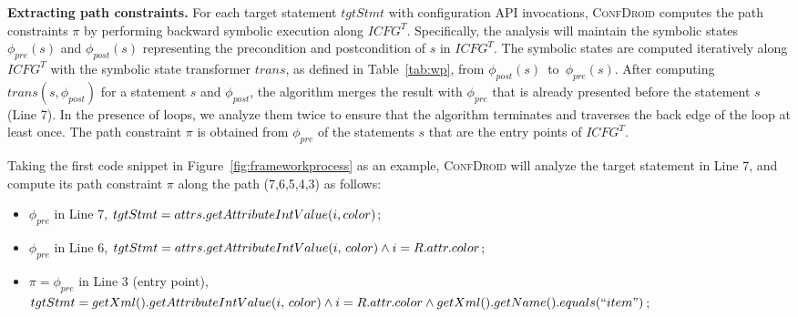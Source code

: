 \textbf{Extracting path constraints.}
\label{sec:extract-conf-constraint}
For each target statement $tgtStmt$ with configuration API invocations, \textsc{ConfDroid} computes the path constraints $\pi$ by performing backward symbolic execution along $ICFG^T$.
Specifically, the analysis will maintain the symbolic states $\phi_{pre}(s)$ and $\phi_{post}(s)$ representing the precondition and postcondition of $s$ in $ICFG^T$.
The symbolic states are computed iteratively along $ICFG^T$ with the symbolic state transformer $trans$, as defined in Table~\ref{tab:wp}, from $\phi_{post}(s)$~to~$\phi_{pre}(s)$.
After computing $trans(s, \phi_{post})$ for a statement $s$ and $\phi_{post}$, the algorithm merges the result with $\phi_{pre}$ that is already presented before the statement $s$ (Line 7).
In the presence of loops, we analyze them twice to ensure that the algorithm terminates and traverses the back edge of the loop at least once.
The path constraint $\pi$ is obtained from $\phi_{pre}$ of the statements $s$ that are the entry points of $ICFG^T$.

Taking the first code snippet in Figure~\ref{fig:frameworkprocess} as an
example,
\textsc{ConfDroid} will analyze the target statement in Line 7, and compute its path constraint $\pi$ along the path (7,6,5,4,3) as follows:

\begin{itemize}
	\item $\phi_{pre}$ in Line 7, $tgtStmt=attrs.getAttributeIntValue\\(i,color)$;
	\item $\phi_{pre}$ in Line 6, $tgtStmt = attrs.getAttributeIntValue\\(i,\,color) \wedge i = R.attr.color$;
	\item $\pi = \phi_{pre}$ in Line 3 (entry point), $tgtStmt = getXml().getAttributeIntValue(i,\,color) \wedge  i = R.attr.color \wedge getXml().getName().equals(``item")$;
\end{itemize}

